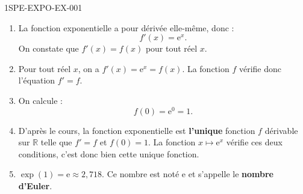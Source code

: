 \begin{corrige}{1SPE-EXPO-EX-001}
\begin{enumerate}
\item La fonction exponentielle a pour dérivée elle-même, donc :
\[f'(x) = \mathrm{e}^x.\]
On constate que $f'(x) = f(x)$ pour tout réel $x$.

\item Pour tout réel $x$, on a $f'(x) = \mathrm{e}^x = f(x)$.
La fonction $f$ vérifie donc l'équation $f' = f$.

\item On calcule :
\[f(0) = \mathrm{e}^0 = 1.\]

\item D'après le cours, la fonction exponentielle est \textbf{l'unique} fonction $f$ dérivable sur $\mathbb{R}$ telle que $f' = f$ et $f(0) = 1$. La fonction $x \mapsto \mathrm{e}^x$ vérifie ces deux conditions, c'est donc bien cette unique fonction.

\item $\exp(1) = \mathrm{e} \approx 2{,}718$. Ce nombre est noté $\mathrm{e}$ et s'appelle le \textbf{nombre d'Euler}.
\end{enumerate}
\end{corrige}
